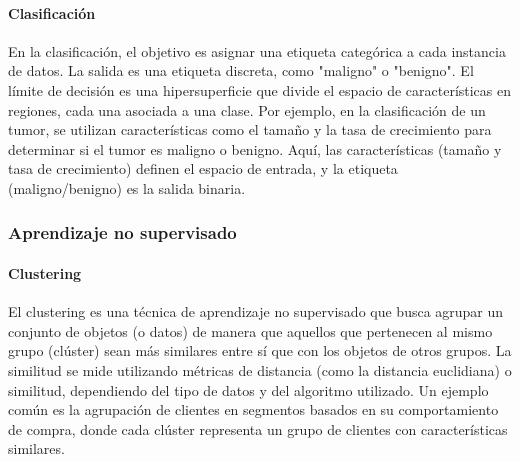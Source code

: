 \paragraph{Clasificación} En la clasificación, el objetivo es asignar una etiqueta categórica a cada instancia de datos. La salida es una etiqueta discreta, como "maligno" o "benigno". El límite de decisión es una hipersuperficie que divide el espacio de características en regiones, cada una asociada a una clase. Por ejemplo, en la clasificación de un tumor, se utilizan características como el tamaño y la tasa de crecimiento para determinar si el tumor es maligno o benigno. Aquí, las características (tamaño y tasa de crecimiento) definen el espacio de entrada, y la etiqueta (maligno/benigno) es la salida binaria.

\subsubsection{Aprendizaje no supervisado}
\paragraph{Clustering} El clustering es una técnica de aprendizaje no supervisado que busca agrupar un conjunto de objetos (o datos) de manera que aquellos que pertenecen al mismo grupo (clúster) sean más similares entre sí que con los objetos de otros grupos. La similitud se mide utilizando métricas de distancia (como la distancia euclidiana) o similitud, dependiendo del tipo de datos y del algoritmo utilizado. Un ejemplo común es la agrupación de clientes en segmentos basados en su comportamiento de compra, donde cada clúster representa un grupo de clientes con características similares.

